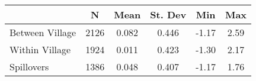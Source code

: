 \begin{tabular}{l*{5}{c}}\hline&\multicolumn{1}{c}{N}&\multicolumn{1}{c}{Mean}&\multicolumn{1}{c}{St. Dev}&\multicolumn{1}{c}{Min}&\multicolumn{1}{c}{Max}\\ \hline 
Between Village & 2126 & 0.082 & 0.446 & -1.17 & 2.59 \\
Within Village & 1924 & 0.011 & 0.423 & -1.30 & 2.17 \\
Spillovers & 1386 & 0.048 & 0.407 & -1.17 & 1.76 \\
\hline \end{tabular}
